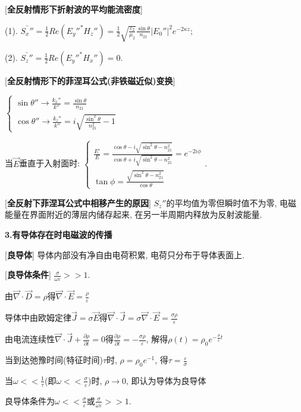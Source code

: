 [\textbf{全反射情形下折射波的平均能流密度}]\par
\qquad (1). $\bar{S_x''}=\frac{1}{2}Re(E_y''^*H_z'')=\frac{1}{2}\sqrt{\frac{\varepsilon_2}{\mu_2}}\frac{\sin\theta}{n_{21}}|E_0''|^2e^{-2\kappa z}$;\par
\qquad (2). $\bar{S_z''}=\frac{1}{2}Re(E_y''^*H_x'')=0$.\par

[\textbf{全反射情形下的菲涅耳公式(非铁磁近似)变换}]\par
\qquad $\begin{cases}\sin\theta''\rightarrow \frac{k_x''}{k''}=\frac{\sin\theta}{n_{21}}\\\cos\theta''\rightarrow\frac{k_z''}{k''}=i\sqrt{\frac{\sin^2\theta}{n_{21}^2}-1}\end{cases}$\par
\qquad\qquad 当$\vec E$垂直于入射面时: $\begin{cases}\frac{E'}{E}=\frac{\cos\theta-i\sqrt{\sin^2\theta-n_{21}^2}}{\cos\theta+i\sqrt{\sin^2\theta-n_{21}^2}}=e^{-2i\phi}\\\tan\phi=\frac{\sqrt{\sin^2\theta-n_{21}^2}}{\cos\theta}\end{cases}$.

\clearpage

[\textbf{全反射下菲涅耳公式中相移产生的原因}] $S_z''$的平均值为零但瞬时值不为零, 电磁能量在界面附近的薄层内储存起来, 在另一半周期内释放为反射波能量.\par

\large 
\begin{center}
 \textbf{3.有导体存在时电磁波的传播}
\end{center}

[\textbf{良导体}] 导体内部没有净自由电荷积累, 电荷只分布于导体表面上.\par

[\textbf{良导体条件}] $\frac{\sigma}{\omega\varepsilon}>>1$.\par
\qquad 由$\vec\nabla\cdot\vec D=\rho$得$\vec\nabla\cdot\vec E=\frac{\rho}{\varepsilon}$\par
\qquad 导体中由欧姆定律$\vec J=\sigma\vec E$得$\vec\nabla\cdot\vec J=\sigma\vec\nabla\cdot\vec E=\frac{\sigma\rho}{\varepsilon}$\par
\qquad 由电流连续性$\vec\nabla\cdot\vec J+\frac{\partial\rho}{\partial t}=0$得$\frac{\partial\rho}{\partial t}=-\frac{\sigma\rho}{\varepsilon}$, 解得$\rho(t)=\rho_0e^{-\frac{\sigma}{\varepsilon}t}$\par
\qquad 当到达弛豫时间(特征时间)$\tau$时, $\rho=\rho_0e^{-1}$, 得$\tau=\frac{\varepsilon}{\sigma}$\par
\qquad 当$\omega<<\frac{1}{\tau}$(即$\omega<<\frac{\sigma}{\varepsilon}$)时, $\rho\rightarrow 0$, 即认为导体为良导体\par
\qquad 良导体条件为$\omega<<\frac{\sigma}{\varepsilon}$或$\frac{\sigma}{\omega\varepsilon}>>1$.\par

